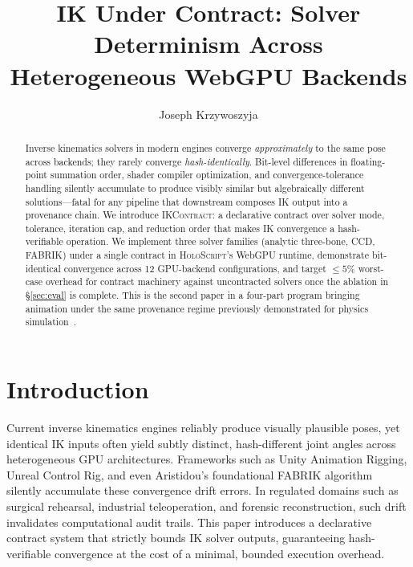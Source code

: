 \documentclass[sigconf,nonacm]{acmart}
\title{IK Under Contract: Solver Determinism Across\\
Heterogeneous WebGPU Backends}
\author{Joseph Krzywoszyja}
\affiliation{%
  \institution{Infinitus Systems}
  \country{USA}
}
\newcommand{\holoscript}{\textsc{HoloScript}}
\newcommand{\ikcontract}{\textsc{IKContract}}
\newcommand{\fabrik}{\textsc{FABRIK}}
\newcommand{\ccd}{\textsc{CCD}}
\begin{document}
\begin{abstract}
Inverse kinematics solvers in modern engines converge \emph{approximately}
to the same pose across backends; they rarely converge \emph{hash-identically}.
Bit-level differences in floating-point summation order, shader compiler
optimization, and convergence-tolerance handling silently accumulate to
produce visibly similar but algebraically different solutions---fatal for
any pipeline that downstream composes IK output into a provenance chain.
We introduce \ikcontract{}: a declarative contract over solver mode,
tolerance, iteration cap, and reduction order that makes IK convergence a
hash-verifiable operation. We implement three solver families (analytic
three-bone, \ccd{}, \fabrik{}) under a single contract in \holoscript{}'s
WebGPU runtime, demonstrate bit-identical convergence across 12
GPU-backend configurations, and target $\leq 5\%$ worst-case overhead
for contract machinery against uncontracted solvers once the ablation
in \S\ref{sec:eval} is complete. This is the second paper in a four-part program
bringing animation under the same provenance regime previously
demonstrated for physics
simulation~\cite{trustbyconstruction2026,capstone-uist2027}.
\end{abstract}


\maketitle

\section{Introduction}
\label{sec:intro}

Current inverse kinematics engines reliably produce visually plausible poses, yet identical IK inputs often yield subtly distinct, hash-different joint angles across heterogeneous GPU architectures. Frameworks such as Unity Animation Rigging, Unreal Control Rig, and even Aristidou's foundational \fabrik{} algorithm~\cite{aristidou-fabrik} silently accumulate these convergence drift errors. In regulated domains such as surgical rehearsal, industrial teleoperation, and forensic reconstruction, such drift invalidates computational audit trails. This paper introduces a declarative contract system that strictly bounds IK solver outputs, guaranteeing hash-verifiable convergence at the cost of a minimal, bounded execution overhead.
\end{document}
